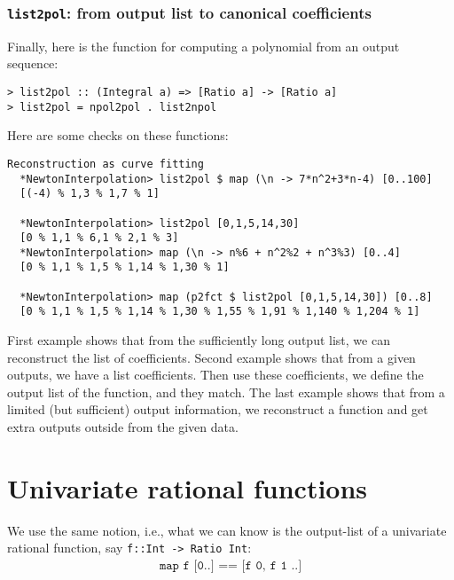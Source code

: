 \documentclass[11pt]{book}
\begin{document}
\subsubsection{\texttt{list2pol}: from output list to canonical coefficients}
Finally, here is the function for computing a polynomial from an output sequence:
\begin{verbatim}
> list2pol :: (Integral a) => [Ratio a] -> [Ratio a]
> list2pol = npol2pol . list2npol
\end{verbatim}
Here are some checks on these functions:
\begin{verbatim}
Reconstruction as curve fitting
  *NewtonInterpolation> list2pol $ map (\n -> 7*n^2+3*n-4) [0..100]
  [(-4) % 1,3 % 1,7 % 1]

  *NewtonInterpolation> list2pol [0,1,5,14,30]
  [0 % 1,1 % 6,1 % 2,1 % 3]
  *NewtonInterpolation> map (\n -> n%6 + n^2%2 + n^3%3) [0..4]
  [0 % 1,1 % 1,5 % 1,14 % 1,30 % 1]

  *NewtonInterpolation> map (p2fct $ list2pol [0,1,5,14,30]) [0..8]
  [0 % 1,1 % 1,5 % 1,14 % 1,30 % 1,55 % 1,91 % 1,140 % 1,204 % 1]

\end{verbatim}
First example shows that from the sufficiently long output list, we can reconstruct the list of coefficients.
Second example shows that from a given outputs, we have a list coefficients.
Then use these coefficients, we define the output list of the function, and they match.
The last example shows that from a limited (but sufficient) output information, we reconstruct a function and get extra outputs outside from the given data.

\section{Univariate rational functions}
We use the same notion, i.e., what we can know is the output-list of a univariate rational function, say \texttt{f::Int -> Ratio Int}:
\begin{eqnarray}
\texttt{map f [0..] == [f 0, f 1 ..]}
\end{eqnarray}
\end{document}
